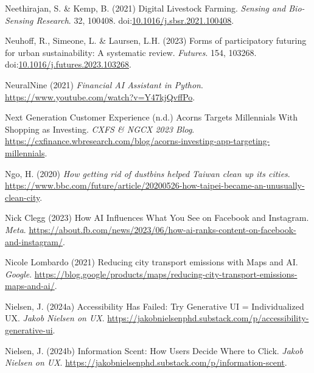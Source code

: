 \documentclass[
  letterpaper,
  DIV=11,
  numbers=noendperiod]{scrartcl}
\newlength{\cslhangindent}
\newenvironment{CSLReferences}[2] %
 {\begin{list}{}{%
  \setlength{\itemindent}{0pt}
  \setlength{\leftmargin}{0pt}
  \setlength{\parsep}{0pt}
  \ifodd #1
   \setlength{\leftmargin}{\cslhangindent}
   \setlength{\itemindent}{-1\cslhangindent}
  \fi
  \setlength{\itemsep}{#2\baselineskip}}}
 {\end{list}}
\begin{document}
\begin{CSLReferences}{0}{1}
Neethirajan, S. \& Kemp, B. (2021) Digital {Livestock Farming}.
\emph{Sensing and Bio-Sensing Research}. 32, 100408.
doi:\href{https://doi.org/10.1016/j.sbsr.2021.100408}{10.1016/j.sbsr.2021.100408}.

Neuhoff, R., Simeone, L. \& Laursen, L.H. (2023) Forms of participatory
futuring for urban sustainability: {A} systematic review.
\emph{Futures}. 154, 103268.
doi:\href{https://doi.org/10.1016/j.futures.2023.103268}{10.1016/j.futures.2023.103268}.

NeuralNine (2021) \emph{Financial {AI Assistant} in {Python}}.
\url{https://www.youtube.com/watch?v=Y47kjQvffPo}.

Next Generation Customer Experience (n.d.) Acorns {Targets Millennials
With Shopping} as {Investing}. \emph{CXFS \& NGCX 2023 Blog}.
\url{https://cxfinance.wbresearch.com/blog/acorns-investing-app-targeting-millennials}.

Ngo, H. (2020) \emph{How getting rid of dustbins helped {Taiwan} clean
up its cities}.
\url{https://www.bbc.com/future/article/20200526-how-taipei-became-an-unusually-clean-city}.

Nick Clegg (2023) How {AI Influences What You See} on {Facebook} and
{Instagram}. \emph{Meta}.
\url{https://about.fb.com/news/2023/06/how-ai-ranks-content-on-facebook-and-instagram/}.

Nicole Lombardo (2021) Reducing city transport emissions with {Maps} and
{AI}. \emph{Google}.
\url{https://blog.google/products/maps/reducing-city-transport-emissions-maps-and-ai/}.

Nielsen, J. (2024a) Accessibility {Has Failed}: {Try Generative UI} =
{Individualized UX}. \emph{Jakob Nielsen on UX}.
\url{https://jakobnielsenphd.substack.com/p/accessibility-generative-ui}.

Nielsen, J. (2024b) Information {Scent}: {How Users Decide Where} to
{Click}. \emph{Jakob Nielsen on UX}.
\url{https://jakobnielsenphd.substack.com/p/information-scent}.


\end{CSLReferences}
\end{document}
